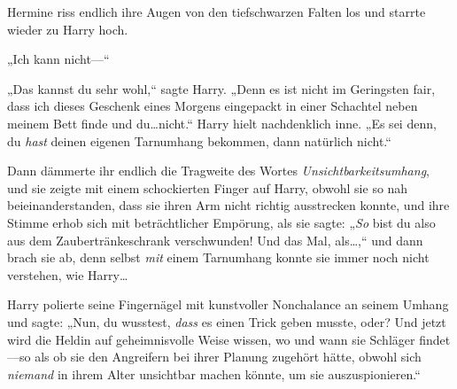Hermine riss endlich ihre Augen von den tiefschwarzen Falten los und starrte wieder zu Harry hoch.

„Ich kann nicht—“

„Das kannst du sehr wohl,“ sagte Harry. „Denn es ist nicht im Geringsten fair, dass ich dieses Geschenk eines Morgens eingepackt in einer Schachtel neben meinem Bett finde und du…nicht.“ Harry hielt nachdenklich inne. „Es sei denn, du \emph{hast} deinen eigenen Tarnumhang bekommen, dann natürlich nicht.“

Dann dämmerte ihr endlich die Tragweite des Wortes \emph{Unsichtbarkeitsumhang}, und sie zeigte mit einem schockierten Finger auf Harry, obwohl sie so nah beieinanderstanden, dass sie ihren Arm nicht richtig ausstrecken konnte, und ihre Stimme erhob sich mit beträchtlicher Empörung, als sie sagte: „\emph{So} bist du also aus dem Zaubertränkeschrank verschwunden! Und das Mal, als…,“ und dann brach sie ab, denn selbst \emph{mit} einem Tarnumhang konnte sie immer noch nicht verstehen, wie Harry…

Harry polierte seine Fingernägel mit kunstvoller Nonchalance an seinem Umhang und sagte: „Nun, du wusstest, \emph{dass} es einen Trick geben musste, oder? Und jetzt wird die Heldin auf geheimnisvolle Weise wissen, wo und wann sie Schläger findet—so als ob sie den Angreifern bei ihrer Planung zugehört hätte, obwohl sich \emph{niemand} in ihrem Alter unsichtbar machen könnte, um sie auszuspionieren.“


